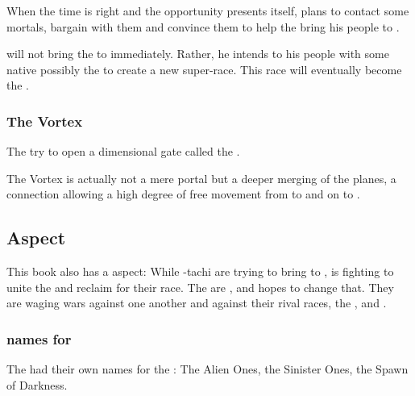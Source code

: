 When the time is right and the opportunity presents itself, \Daggerrain{} plans to contact some \Miithian{} mortals, bargain with them and convince them to help the \banelord{} bring his people to \Miith{}. 

\Daggerrain{} will not bring the \banes{} to \Miith{} immediately. Rather, he intends to  his people with some native \Miithians\dash possibly the \nephilim\dash to create a new super-race. This race will eventually become the . 





\subsubsection{The Vortex}
The \banes{} try to open a dimensional gate called the . 

The Vortex is actually not a mere portal but a deeper merging of the planes, a connection allowing a high degree of free movement from \Erebos{} to \Nyx{} and on to \Miith{}. 









\subsection{\Draconian{} Aspect}
This book also has a \draconian{} aspect: 
While \Semiza-tachi are trying to bring \banes{} to \Miith{}, \Nexagglachel{} is fighting to unite the \dragons{} and reclaim \Miith{} for their race. 
The \dragons{} are , and \Nexagglachel{} hopes to change that. 
They are waging wars against one another and against their rival races, the \quiljaaran, \vorcanths{} and \nagae. 





\subsubsection{\Draconic names for \banes}
The \dragons{} had their own names for the \banes: 
The Alien Ones, the Sinister Ones, the Spawn of Darkness. 









